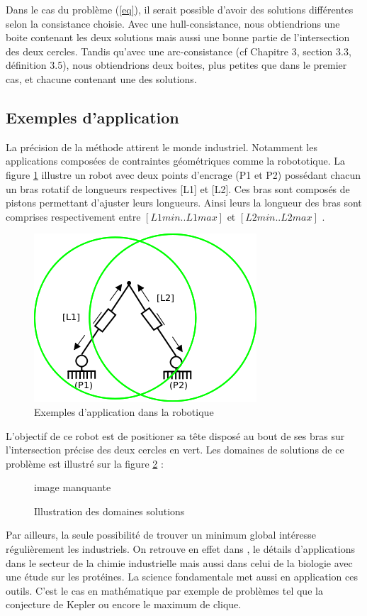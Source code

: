 Dans le cas du problème (\ref{eq}), il serait possible d'avoir des solutions différentes selon la consistance choisie. Avec une hull-consistance, nous obtiendrions une boite contenant les deux solutions mais aussi une bonne partie de l'intersection des deux cercles. Tandis qu'avec une arc-consistance (cf \cite{Goualard} Chapitre 3, section 3.3, définition 3.5), nous obtiendrions deux boites, plus petites que dans le premier cas, et chacune contenant une des solutions.


\subsection{Exemples d'application}

La précision de la méthode attirent le monde industriel. Notamment les applications composées de contraintes géométriques comme la robototique. La figure \ref{fig:rob} illustre un robot avec deux points d'encrage (P1 et P2) possédant chacun un bras rotatif de longueurs respectives [L1] et [L2]. Ces bras sont composés de pistons permettant d'ajuster leurs longueurs. Ainsi leurs la longueur des bras sont comprises respectivement entre $[L1min .. L1max]$ et $[L2min .. L2max]$ . 

\begin{figure}[h] %
  \center
\includegraphics[scale=0.80]{img/robot2}
  \caption{Exemples d'application dans la robotique} %
 \label{fig:rob} %
\end{figure} %
L'objectif de ce robot est de positioner sa tête disposé au bout de ses bras sur l'intersection précise des deux cercles en vert.  Les domaines de solutions de ce problème est illustré sur la figure \ref{fig:rob2} : 

\begin{figure}[h] %
  \center
\huge image manquante
  \caption{Illustration des domaines solutions} %
 \label{fig:rob2} %
\end{figure} %
  Par ailleurs, la seule possibilité de trouver un minimum global intéresse régulièrement les industriels. On retrouve en effet dans \cite{Schichl}, le détails d'applications dans le secteur de la chimie industrielle mais aussi dans celui de la biologie avec une étude sur les protéines.
 La science fondamentale met aussi en application ces outils. C'est le cas en mathématique par exemple de problèmes tel que la conjecture de Kepler ou encore le  maximum de clique.
 \clearpage
